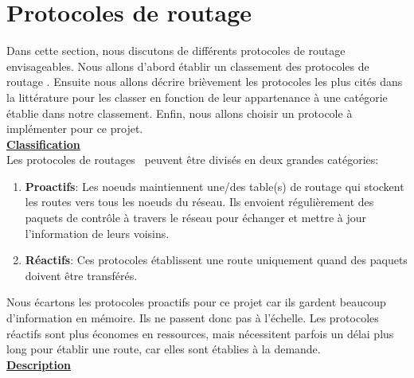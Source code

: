\section{Protocoles de routage}
    Dans cette section, nous discutons de différents protocoles de routage envisageables.
    Nous allons d'abord établir un classement des protocoles de routage \mesh.
    Ensuite nous allons décrire brièvement les protocoles les plus cités dans la littérature pour les classer
    en fonction de leur appartenance à une catégorie établie dans notre classement. 
    Enfin, nous allons choisir un protocole à implémenter pour ce projet.\\

    \underline{\textbf{Classification}}\\

    Les protocoles de routages \mesh\ peuvent être divisés en deux grandes catégories:
    \begin{enumerate}
        \item \textbf{Proactifs}: Les noeuds maintiennent une/des table(s) de routage
            qui stockent les routes vers tous les noeuds du réseau. 
            Ils envoient régulièrement des paquets de contrôle à travers le réseau pour échanger et 
            mettre à jour l'information de leurs voisins.
        \item \textbf{Réactifs}: Ces protocoles établissent une route uniquement quand des paquets
            doivent être transférés.
    \end{enumerate}
    Nous écartons les protocoles proactifs pour ce projet car ils gardent
    beaucoup d'information en mémoire. Ils ne passent donc pas à l'échelle.
    Les protocoles réactifs sont plus économes en ressources, mais nécessitent parfois un délai
    plus long pour établir une route, car elles sont établies à la demande.\\

    \underline{\textbf{Description}}\\

